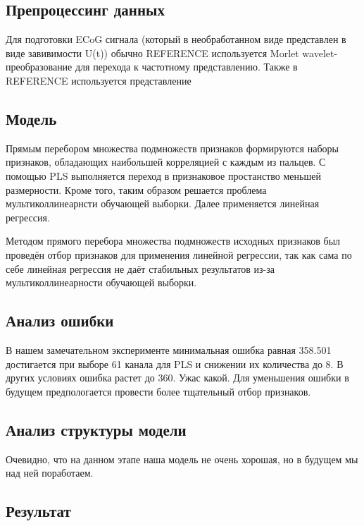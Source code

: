 \documentclass[12pt,twoside]{article}
\begin{document}
\subsection{Препроцессинг данных}
Для подготовки ECoG сигнала (который в необработанном виде представлен в виде завивимости U(t)) обычно REFERENCE используется Morlet wavelet-преобразование для перехода к частотному представлению. Также в REFERENCE используется представление 



\subsection{Модель}

Прямым перебором множества подмножеств признаков формируются наборы признаков, обладающих наибольшей корреляцией с каждым из пальцев. С помощью PLS выполняется переход в признаковое простанство меньшей размерности. Кроме того, таким образом решается проблема мультиколлинеарнсти обучающей выборки. Далее применяется линейная регрессия.  

Методом прямого перебора множества подмножеств исходных признаков был проведён отбор признаков для применения линейной регрессии, так как сама по себе линейная регрессия не даёт стабильных результатов из-за мультиколлинеарности обучающей выборки.  

\subsection{Анализ ошибки}

В нашем замечательном эксперименте минимальная ошибка равная 358.501 достигается при выборе 61 канала для PLS и снижении их количества до 8. В других условиях ошибка растет до 360. Ужас какой. Для уменьшения ошибки в будущем предпологается провести более тщательный отбор признаков.

\subsection{Анализ структуры модели}

Очевидно, что на данном этапе наша модель не очень хорошая, но в будущем мы над ней поработаем.


\subsection{Результат}
\end{document}
